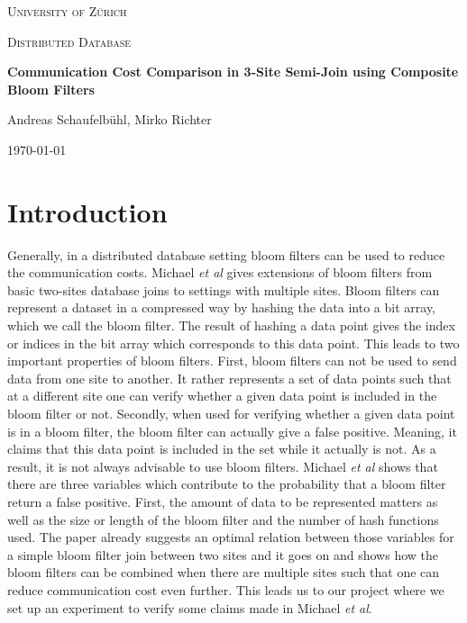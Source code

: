 \documentclass[12]{scrartcl}
\begin{document}
\begin{titlepage}
	\centering
	{\scshape\LARGE University of Zürich\par}
	\vspace{1cm}
	{\scshape\Large Distributed Database\par}
	\vspace{1.5cm}
	{\huge\bfseries Communication Cost Comparison in 3-Site Semi-Join using Composite Bloom Filters\par}
	\vspace{2cm}
	{\Large Andreas Schaufelbühl, Mirko Richter\par}
	\vfill
	
	{\large \today\par}
\end{titlepage}

\tableofcontents
\listoffigures
\newpage
	
\section{Introduction}
 Generally, in a distributed database setting bloom filters can be used to reduce the communication costs. Michael {\em et al}\cite{michael} gives extensions of bloom filters from basic two-sites database joins to settings with multiple sites. Bloom filters can represent a dataset in a compressed way by hashing the data into a bit array, which we call the bloom filter. The result of hashing a data point gives the index or indices in the bit array which corresponds to this data point. This leads to two important properties of bloom filters. First, bloom filters can not be used to send data from one site to another. It rather represents a set of data points such that at a different site one can verify whether a given data point is included in the bloom filter or not. Secondly, when used for verifying whether a given data point is in a bloom filter, the bloom filter can actually give a false positive. Meaning, it claims that this data point is included in the set while it actually is not. As a result, it is not always advisable to use bloom filters. Michael {\em et al}\cite{michael} shows that there are three variables which contribute to the probability that a bloom filter return a false positive. First, the amount of data to be represented matters as well as the size or length of the bloom filter and the number of hash functions used. The paper already suggests an optimal relation between those variables for a simple bloom filter join between two sites and it goes on and shows how the bloom filters can be combined when there are multiple sites such that one can reduce communication cost even further. This leads us to our project where we set up an experiment to verify some claims made in Michael {\em et al}\cite{michael}.
\end{document}
